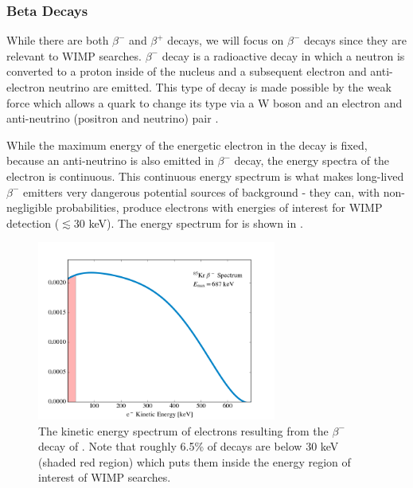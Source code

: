 \subsubsection{Beta Decays}

While there are both $\beta^-$ and $\beta^+$ decays, we will focus on $\beta^-$ decays since they are relevant to WIMP searches.  $\beta^-$ decay is a radioactive decay in which a neutron is converted to a proton inside of the nucleus and a subsequent electron and anti-electron neutrino are emitted.  This type of decay is made possible by the weak force which allows a quark to change its type via a W boson and an electron and anti-neutrino (positron and neutrino) pair \cite{cottingham1987introduction}.

While the maximum energy of the energetic electron in the decay is fixed, because an anti-neutrino is also emitted in $\beta^-$ decay, the energy spectra of the electron is continuous.  This continuous energy spectrum is what makes long-lived $\beta^-$ emitters very dangerous potential sources of background - they can, with non-negligible probabilities, produce electrons with energies of interest for WIMP detection ($\lesssim 30$ keV).  The energy spectrum for  is shown in .

\begin{figure}[t]
	\centering
	\includegraphics[width=0.7\textwidth]{kr85_beta_rates}
	\caption{The kinetic energy spectrum of electrons resulting from the $\beta^-$ decay of  \cite{mantel1972beta}.  Note that roughly 6.5\% of decays are below 30 keV (shaded red region) which puts them inside the energy region of interest of WIMP searches.}
	\label{fig:kr85_beta_decay}
\end{figure}


